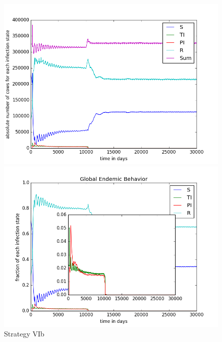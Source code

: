 \begin{figure}[htbp]
\begin{minipage}{0.5\textwidth}
\centering
\noindent\includegraphics[width=0.95\linewidth,height=\textheight,
keepaspectratio]{cont6btotalEndemicNumbers.png} 
\end{minipage}
\begin{minipage}{0.5\textwidth}
\centering
\noindent\includegraphics[width=0.95\linewidth,height=\textheight,
keepaspectratio]{cont6bpendemicFractions.png} 
\end{minipage}
\caption[Endemic Behavior in Containment Strategy Six B]{Strategy VIb}
\label{fig:contStrat6b}
\end{figure}

